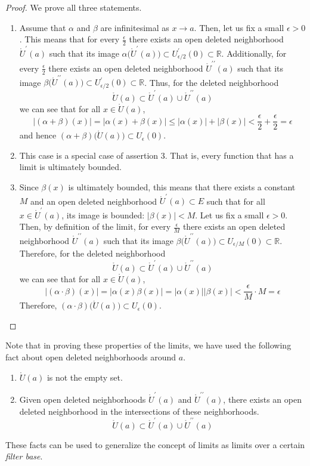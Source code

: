 \documentclass{article}
\theoremstyle{remark}
\theoremstyle{definition}
\begin{document}
\begin{proof}
We prove all three statements. 
\begin{enumerate}
    \item Assume that $\alpha$ and $\beta$ are infinitesimal as $x \rightarrow a$. Then, let us fix a small $\epsilon>0$. This means that for every $\frac{\epsilon}{2}$ there exists an open deleted neighborhood $\mathring{U}^\prime (a)$ such that its image $\alpha\big(\mathring{U}^\prime (a)\big)\subset U^\prime_{\epsilon/2} (0) \subset \mathbb{R}$. Additionally, for every $\frac{\epsilon}{2}$ there exists an open deleted neighborhood $\mathring{U}^{\prime\prime} (a)$ such that its image $\beta\big(\mathring{U}^{\prime\prime} (a)\big)\subset U^\prime_{\epsilon/2} (0) \subset \mathbb{R}$.
    Thus, for the deleted neighborhood 
    \[\mathring{U}(a) \subset \mathring{U}^\prime (a) \cup \mathring{U}^{\prime\prime} (a)\]
    we can see that for all $x \in \mathring{U}(a)$, 
    \[|(\alpha + \beta)(x)| = |\alpha (x) + \beta(x)| \leq |\alpha (x)| + |\beta(x)| < \frac{\epsilon}{2} + \frac{\epsilon}{2} = \epsilon\]
    and hence $(\alpha + \beta)\big( \mathring{U}(a)\big) \subset U_\epsilon (0)$. 
    \item This case is a special case of assertion 3. That is, every function that has a limit is ultimately bounded. 
    \item Since $\beta(x)$ is ultimately bounded, this means that there exists a constant $M$ and an open deleted neighborhood $\mathring{U}^\prime (a) \subset E$ such that for all $x \in \mathring{U}^\prime (a)$, its image is bounded: $|\beta(x)|<M$. Let us fix a small $\epsilon>0$. Then, by definition of the limit, for every $\frac{\epsilon}{M}$ there exists an open deleted neighborhood $\mathring{U}^{\prime\prime} (a)$ such that its image $\beta\big(\mathring{U}^{\prime\prime}(a)\big) \subset U_{\epsilon/M} (0) \subset \mathbb{R}$. Therefore, for the deleted neighborhood
    \[\mathring{U}(a) \subset \mathring{U}^\prime (a) \cup \mathring{U}^{\prime\prime}(a)\]
    we can see that for all $x \in \mathring{U} (a)$, 
    \[|(\alpha \cdot \beta)(x)| = |\alpha (x) \beta(x)| = |\alpha (x)| |\beta(x)| < \frac{\epsilon}{M} \cdot M = \epsilon\]
    Therefore, $(\alpha \cdot \beta)\big( \mathring{U} (a)\big) \subset U_\epsilon (0)$. 
\end{enumerate}
\end{proof}

Note that in proving these properties of the limits, we have used the following fact about open deleted neighborhoods around $a$. 
\begin{enumerate}
    \item $\mathring{U} (a)$ is not the empty set. 
    \item Given open deleted neighborhoods $\mathring{U}^\prime (a)$ and $\mathring{U}^{\prime\prime} (a)$, there exists an open deleted neighborhood in the intersections of these neighborhoods. 
    \[\mathring{U} (a) \subset \mathring{U}^\prime (a) \cup \mathring{U}^{\prime\prime} (a)\]
\end{enumerate}
These facts can be used to generalize the concept of limits as limits over a certain \textit{filter base}. 
\end{document}
